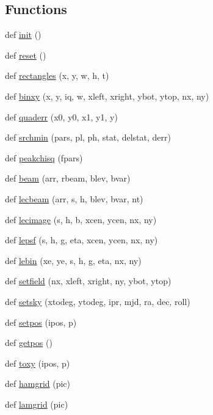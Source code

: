 \subsection*{Functions}
\begin{DoxyCompactItemize}
\item 
def \hyperlink{namespaceimages_ac92b24c860ad521a28ab90e93ca5abfb}{init} ()
\item 
def \hyperlink{namespaceimages_a4f1351dead951fa6728f4f26e6471859}{reset} ()
\item 
def \hyperlink{namespaceimages_aef48128ba9b2f8644c43c09f80f20fa0}{rectangles} (x, y, w, h, t)
\item 
def \hyperlink{namespaceimages_af631fb0f1f2077642b9a988d0bff71e7}{binxy} (x, y, iq, w, xleft, xright, ybot, ytop, nx, ny)
\item 
def \hyperlink{namespaceimages_a8faa811be5f0e7dea19b18e20bbc76e9}{quaderr} (x0, y0, x1, y1, y)
\item 
def \hyperlink{namespaceimages_a7ce1b8de9c2c387025e825e92846dc13}{srchmin} (pars, pl, ph, stat, delstat, derr)
\item 
def \hyperlink{namespaceimages_ae7c9d2cea3fe9a06533d6823fb7065d2}{peakchisq} (fpars)
\item 
def \hyperlink{namespaceimages_a9c1032a597aef7de43c3a8eaa61f9ceb}{beam} (arr, rbeam, blev, bvar)
\item 
def \hyperlink{namespaceimages_af968ed455d536c5be4a28b5984765f3d}{lecbeam} (arr, s, h, blev, bvar, nt)
\item 
def \hyperlink{namespaceimages_a09118bff749ce221bcab7cbc813f3e5e}{lecimage} (s, h, b, xcen, ycen, nx, ny)
\item 
def \hyperlink{namespaceimages_abf1baa121ee75e999c92c7f23b7dc42e}{lepsf} (s, h, g, eta, xcen, ycen, nx, ny)
\item 
def \hyperlink{namespaceimages_a79aa7fa090e0f357563943c408dab1da}{lebin} (xe, ye, s, h, g, eta, nx, ny)
\item 
def \hyperlink{namespaceimages_a3b0ccac946edc83732a3f3d384923ecd}{setfield} (nx, xleft, xright, ny, ybot, ytop)
\item 
def \hyperlink{namespaceimages_a7d6713340c9393df65d12c8950f974f4}{setsky} (xtodeg, ytodeg, ipr, mjd, ra, dec, roll)
\item 
def \hyperlink{namespaceimages_a3c53030859724daa5e9f1a7ff57ecf3a}{setpos} (ipos, p)
\item 
def \hyperlink{namespaceimages_a2e557404e1d244d054cf8aa9cf903904}{getpos} ()
\item 
def \hyperlink{namespaceimages_a5a4b780aa3a5620fdc96c7d8c5e7be4e}{toxy} (ipos, p)
\item 
def \hyperlink{namespaceimages_afd0737141ef5575ecbc9c1ad9ac96704}{hamgrid} (pic)
\item 
def \hyperlink{namespaceimages_ad402eee968601fff4f6274f444c60b94}{lamgrid} (pic)
\end{DoxyCompactItemize}


